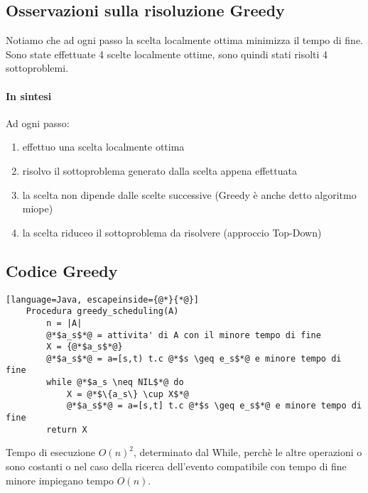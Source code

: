 \subsection{Osservazioni sulla risoluzione Greedy}
Notiamo che ad ogni passo la scelta localmente ottima minimizza il tempo di fine. Sono state effettuate
4 scelte localmente ottime, sono quindi stati risolti 4 sottoproblemi.\\
\paragraph*{In sintesi} Ad ogni passo:
\begin{enumerate}
    \item effettuo una scelta localmente ottima
    \item risolvo il sottoproblema generato dalla scelta appena effettuata
    \item la scelta non dipende dalle scelte successive (Greedy è anche detto algoritmo miope)
    \item la scelta riduceo il sottoproblema da risolvere (approccio Top-Down)
\end{enumerate}
\subsection{Codice Greedy}
\begin{lstlisting}[language=Java, escapeinside={@*}{*@}]
    Procedura greedy_scheduling(A)
        n = |A|
        @*$a_s$*@ = attivita' di A con il minore tempo di fine
        X = {@*$a_s$*@}
        @*$a_s$*@ = a=[s,t) t.c @*$s \geq e_s$*@ e minore tempo di fine
        while @*$a_s \neq NIL$*@ do
            X = @*$\{a_s\} \cup X$*@
            @*$a_s$*@ = a=[s,t] t.c @*$s \geq e_s$*@ e minore tempo di fine
        return X
\end{lstlisting}
Tempo di esecuzione $O(n)^2$, determinato dal While, perchè le altre
operazioni o sono costanti o nel caso della ricerca dell'evento compatibile
con tempo di fine minore impiegano tempo $O(n)$.
